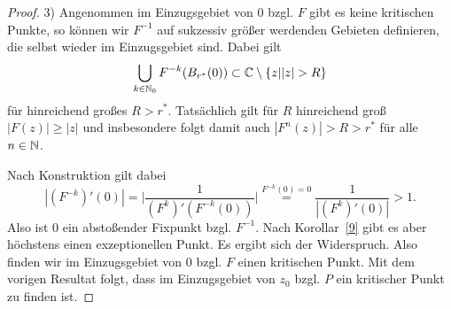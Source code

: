 \documentclass{mywork}
\begin{document}
\begin{proof}
3) Angenommen im Einzugsgebiet von $0$ bzgl. $F$ gibt es keine kritischen Punkte, so können wir $F^{-1}$ auf sukzessiv größer werdenden Gebieten definieren, die selbst wieder im Einzugsgebiet sind. Dabei gilt
\[
\bigcup_{k\in \N_0} F^{-k}(B_{r^*}(0))\subset \C\setminus \{z| |z|>R\}
\] 
für hinreichend großes $R>r^*$. Tatsächlich gilt für $R$  hinreichend groß $|F(z)| \ge |z|$ und insbesondere folgt damit auch $|F^n(z)|>R>r^*$ für alle $n\in \mathbb{N}$. 

Nach Konstruktion gilt dabei 
\[
|(F^{-k})'(0)|=\Bigg|\frac{1}{(F^k)'(F^{-k}(0))} \Bigg|\stackrel{F^{-k}(0)=0}= \frac{1}{|(F^k)'(0)|}>1.
\]
Also ist $0$ ein abstoßender Fixpunkt bzgl. $F^{-1}$. Nach Korollar~\ref{9} gibt es aber höchstens einen exzeptionellen Punkt. Es ergibt sich der Widerspruch. Also finden wir im Einzugsgebiet von $0$ bzgl. $F$ einen kritischen Punkt. Mit dem vorigen Resultat folgt, dass im Einzugsgebiet von $z_0$ bzgl. $P$ ein kritischer Punkt zu finden ist.
\end{proof}
\end{document}
